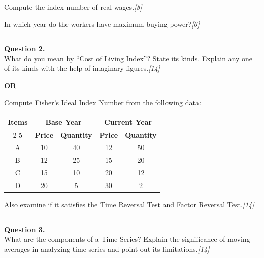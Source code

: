 \documentclass[11pt,a4paper]{article}
\newcommand{\pts}[1]{\hfill   \textit{[#1]}}
\begin{document}
\begin{parts}
  \item Compute the index number of real wages.\pts{8}
  \item In which year do the workers have maximum buying power?\pts{6}
\end{parts}

\medskip\rule{\linewidth}{0.2pt}




\noindent   \textbf{Question 2.} \\
What do you mean by ``Cost of Living Index''? State its kinds. Explain any one of its kinds with the help of imaginary figures.\pts{14}

\centerline{   \textbf{OR}}

Compute Fisher's Ideal Index Number from the following data:

\begin{center}
\renewcommand{\arraystretch}{1.2}
\small

\begin{tabular}{|c|c|c|c|c|}
\hline
   \textbf{Items} & \multicolumn{2}{c|}{   \textbf{Base Year}} & \multicolumn{2}{c|}{   \textbf{Current Year}} \\ \cline{2-5}
               &   \textbf{Price} &   \textbf{Quantity}      &   \textbf{Price} &   \textbf{Quantity}         \\ \hline
A              & 10             & 40                     & 12             & 50                        \\
B              & 12             & 25                     & 15             & 20                        \\
C              & 15             & 10                     & 20             & 12                        \\
D              & 20             & 5                      & 30             & 2                         \\ \hline
\end{tabular}
\end{center}
Also examine if it satisfies the Time Reversal Test and Factor Reversal Test.\pts{14}

\medskip\rule{\linewidth}{0.2pt}




\noindent   \textbf{Question 3.} \\
What are the components of a Time Series? Explain the significance of moving averages in analyzing time series and point out its limitations.\pts{14}
\end{document}
